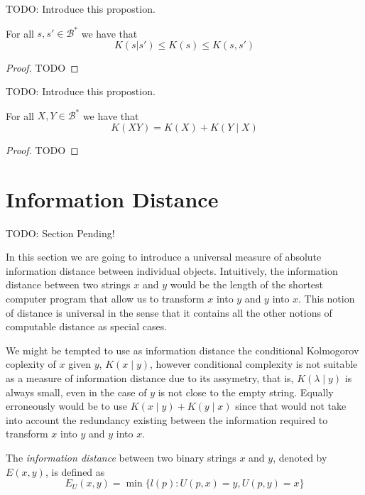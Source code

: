 {\color{red} TODO: Introduce this propostion.}

\begin{proposition}
\label{prop:kolmogorov_relations}
For all $s, s'\in\mathcal{B}^{\ast}$ we have that
\[
K(s | s' ) \leq K(s) \leq K(s, s')
\]
\end{proposition}
\begin{proof}
{\color{red} TODO}
\end{proof}

{\color{red} TODO: Introduce this propostion.}

\begin{proposition}
\label{prop:kolmogorov_relations}
For all $X, Y\in\mathcal{B}^{\ast}$ we have that
\[
K(XY) = K(X) + K(Y \mid X)
\]
\end{proposition}
\begin{proof}
{\color{red} TODO}
\end{proof}




%
%

\section{Information Distance}
\label{sec:information_distance}

{\color{red} TODO: Section Pending!}

In this section we are going to introduce a universal measure of absolute information distance between individual objects. Intuitively, the information distance between two strings $x$ and $y$ would be the length of the shortest computer program that allow us to transform $x$ into $y$ and $y$ into $x$. This notion of distance is universal in the sense that it contains all the other notions of computable distance as special cases.

We might be tempted to use as information distance the conditional Kolmogorov coplexity of $x$ given $y$, $K(x \mid y)$, however conditional complexity is not suitable as a measure of information distance due to its assymetry, that is, $K( \lambda \mid y)$ is always small, even in the case of $y$ is not close to the empty string. Equally erroneously would be to use $K(x \mid y) + K(y \mid x)$ since that would not take into account the redundancy existing between the information required to transform $x$ into $y$ and $y$ into $x$.

\begin{definition}
The \emph{information distance} between two binary strings $x$ and $y$, denoted by $E(x, y)$, is defined as
\[
E_U(x, y) = \min \{ l(p) : U(p, x) = y, U(p, y) = x \}
\]
\end{definition}

